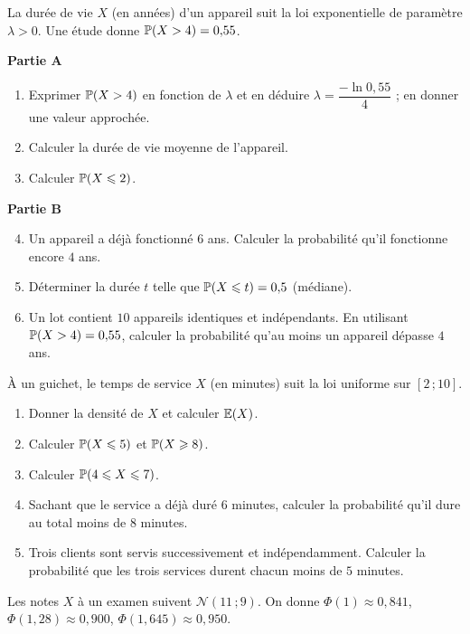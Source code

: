 La durée de vie $X$ (en années) d'un appareil suit la loi exponentielle de
paramètre $\lambda>0$. Une étude donne $\mathbb{P}(X>4)=0{,}55$.

\textbf{Partie A}
\begin{enumerate}
	\item Exprimer $\mathbb{P}(X>4)$ en fonction de $\lambda$ et en déduire
	$\lambda = \dfrac{-\ln 0{,}55}{4}$ ; en donner une valeur approchée.
	\item Calculer la durée de vie moyenne de l'appareil.
	\item Calculer $\mathbb{P}(X\leqslant 2)$.
\end{enumerate}

\textbf{Partie B}
\begin{enumerate}
	\setcounter{enumi}{3}
	\item Un appareil a déjà fonctionné $6$ ans. Calculer la probabilité
	qu'il fonctionne encore $4$ ans.
	\item Déterminer la durée $t$ telle que $\mathbb{P}(X\leqslant t)=0{,}5$
	(médiane).
	\item Un lot contient $10$ appareils identiques et indépendants. En
	utilisant $\mathbb{P}(X>4)=0{,}55$, calculer la probabilité qu'au moins un
	appareil dépasse $4$ ans.
\end{enumerate}

À un guichet, le temps de service $X$ (en minutes) suit la loi uniforme sur
$[2\,;10]$.
\begin{enumerate}
	\item Donner la densité de $X$ et calculer $\mathbb{E}(X)$.
	\item Calculer $\mathbb{P}(X\leqslant 5)$ et $\mathbb{P}(X\geqslant 8)$.
	\item Calculer $\mathbb{P}(4\leqslant X\leqslant 7)$.
	\item Sachant que le service a déjà duré $6$ minutes, calculer la
	probabilité qu'il dure au total moins de $8$ minutes.
	\item Trois clients sont servis successivement et indépendamment.
	Calculer la probabilité que les trois services durent chacun moins de
	$5$ minutes.
\end{enumerate}

Les notes $X$ à un examen suivent $\mathscr{N}(11\,;9)$. On donne
$\Phi(1)\approx 0{,}841$, $\Phi(1{,}28)\approx 0{,}900$,
$\Phi(1{,}645)\approx 0{,}950$.

